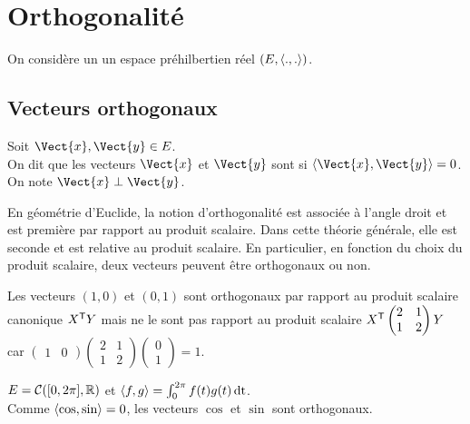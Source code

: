 \documentclass{book}
\begin{document}
\section{Orthogonalité}
On considère un un espace préhilbertien réel $(E,\langle.,.\rangle)$.

%
\subsection{Vecteurs orthogonaux}

\begin{Definition}
Soit $\Vect{x},\Vect{y}\in E$.\\
On dit que les vecteurs $\Vect{x}$ et $\Vect{y}$ sont  si $\PS{\Vect{x}}{\Vect{y}} = 0$.\\
On note $\Vect{x} \perp \Vect{y}$.
\end{Definition}
En géométrie d'Euclide, la notion d'orthogonalité est associée  à l'angle droit et est première par rapport au produit scalaire. Dans cette théorie générale, elle est seconde et est relative au produit scalaire. En particulier, en fonction du choix du produit scalaire, deux vecteurs peuvent être orthogonaux ou non.
\begin{Exemple}
Les vecteurs $(1,0)$ et $(0,1)$ sont orthogonaux par rapport au produit scalaire canonique $X^{\mathsf {T}}Y$  mais ne le sont pas rapport au produit scalaire $X^{\mathsf {T}}\begin{pmatrix}
2&1 \\1&2
\end{pmatrix}Y$ car $\begin{pmatrix}
1 &0
\end{pmatrix}\begin{pmatrix}
2&1 \\1&2
\end{pmatrix}\begin{pmatrix}
0 \\1
\end{pmatrix}=1$.
\end{Exemple}
\begin{Exemple}
$E=\mathcal{C}([0,2\pi],\mathbb{R} )$ et $\langle f,g\rangle= \int_0^{2\pi} f(t)g(t)\,\mathrm{dt} $.\\
Comme $\langle\cos,\sin\rangle=0$, les vecteurs $\cos$ et $\sin$ sont orthogonaux. 
\end{Exemple}   
\end{document}
